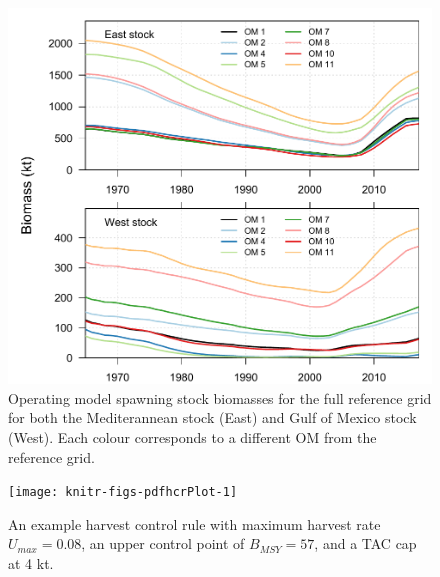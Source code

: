 \documentclass[]{article}
\begin{document}
\begin{figure}[htb]

{\centering \includegraphics[width=0.9\linewidth]{data/OMbiomass} 

}

\caption{Operating model spawning stock biomasses for the full reference grid for both the Mediterannean stock (East) and Gulf of Mexico stock (West). Each colour corresponds to a different OM from the reference grid.}\label{fig:OMbioPlot}
\end{figure}

\newpage

\begin{figure}[htb]

{\centering \texttt{[image: knitr-figs-pdfhcrPlot-1]} 

}

\caption{An example harvest control rule with maximum harvest rate $U_{max} =  0.08$, an upper control point of $B_{MSY} = 57$, and a TAC cap at 4 kt.}\label{fig:hcrPlot}
\end{figure}

\newpage
\end{document}
